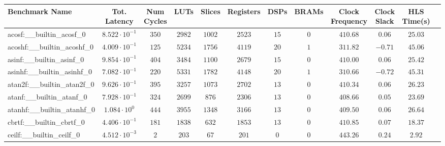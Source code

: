 \begin{tabular}{|l|c|c|c|c|c|c|c|c|c|c|c|}
\hline
Benchmark Name                            & Tot. Latency            & Num Cycles & LUTs      & Slices    & Registers & DSPs    & BRAMs & Clock Frequency & Clock Slack & HLS Time(s) \\
\hline
acosf:\_\_builtin\_acosf\_0               & $ 8.522 \cdot 10^{-1} $ & $ 350    $ & $ 2982  $ & $ 1002  $ & $ 2523  $ & $ 15  $ & $ 0 $ & $ 410.68      $ & $ 0.06    $ & $ 25.03   $ \\
acoshf:\_\_builtin\_acoshf\_0             & $ 4.009 \cdot 10^{-1} $ & $ 125    $ & $ 5234  $ & $ 1756  $ & $ 4119  $ & $ 20  $ & $ 1 $ & $ 311.82      $ & $ -0.71   $ & $ 45.06   $ \\
asinf:\_\_builtin\_asinf\_0               & $ 9.854 \cdot 10^{-1} $ & $ 404    $ & $ 3484  $ & $ 1100  $ & $ 2679  $ & $ 15  $ & $ 0 $ & $ 410.00      $ & $ 0.06    $ & $ 25.42   $ \\
asinhf:\_\_builtin\_asinhf\_0             & $ 7.082 \cdot 10^{-1} $ & $ 220    $ & $ 5331  $ & $ 1782  $ & $ 4148  $ & $ 20  $ & $ 1 $ & $ 310.66      $ & $ -0.72   $ & $ 45.31   $ \\
atan2f:\_\_builtin\_atan2f\_0             & $ 9.626 \cdot 10^{-1} $ & $ 395    $ & $ 3257  $ & $ 1073  $ & $ 2702  $ & $ 13  $ & $ 0 $ & $ 410.34      $ & $ 0.06    $ & $ 26.23   $ \\
atanf:\_\_builtin\_atanf\_0               & $ 7.928 \cdot 10^{-1} $ & $ 324    $ & $ 2699  $ & $ 876   $ & $ 2306  $ & $ 13  $ & $ 0 $ & $ 408.66      $ & $ 0.05    $ & $ 23.69   $ \\
atanhf:\_\_builtin\_atanhf\_0             & $ 1.084 \cdot 10^{0}  $ & $ 444    $ & $ 3955  $ & $ 1348  $ & $ 3166  $ & $ 13  $ & $ 0 $ & $ 409.50      $ & $ 0.06    $ & $ 26.64   $ \\
cbrtf:\_\_builtin\_cbrtf\_0               & $ 4.406 \cdot 10^{-1} $ & $ 181    $ & $ 1838  $ & $ 632   $ & $ 1853  $ & $ 13  $ & $ 0 $ & $ 410.85      $ & $ 0.07    $ & $ 18.37   $ \\
ceilf:\_\_builtin\_ceilf\_0               & $ 4.512 \cdot 10^{-3} $ & $ 2      $ & $ 203   $ & $ 67    $ & $ 201   $ & $ 0   $ & $ 0 $ & $ 443.26      $ & $ 0.24    $ & $ 2.92    $ \\

\end{tabular}

